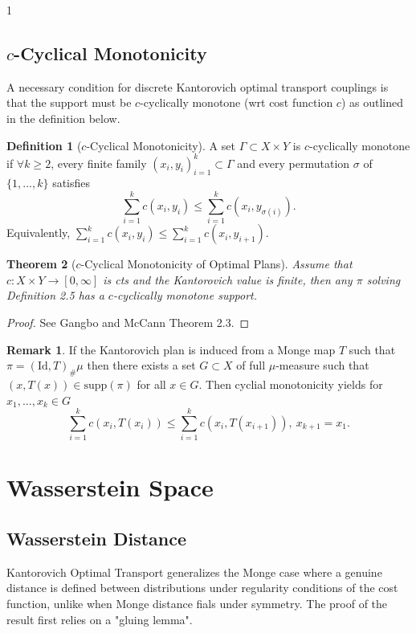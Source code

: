 \documentclass[12pt]{article}
\newtheorem{theorem}{Theorem}[section]
\theoremstyle{definition}
\newtheorem{definition}[theorem]{Definition}
\newtheorem*{remark}{Remark}
\theoremstyle{plain}
\begin{document}
\begin{spacing}{1}
{\newpage
\subsection{$c$-Cyclical Monotonicity}

A necessary condition for discrete Kantorovich optimal transport couplings is that the support must be $c$-cyclically monotone (wrt cost function $c$) as outlined in the definition below.

\begin{definition}[$c$-Cyclical Monotonicity]
    A set $\Gamma \subset X \times Y$ is $c$-cyclically monotone if $\forall k \geq 2$, every finite family $(x_i, y_i)_{i = 1}^k \subset \Gamma$ and every permutation $\sigma$ of $\{1, ..., k\}$ satisfies 
    \[
    \sum_{i = 1}^k c(x_i, y_i) \leq \sum_{i = 1}^k c(x_i, y_{\sigma(i)}).
    \]
    Equivalently, $\sum_{i = 1}^k c(x_i, y_i) \leq \sum_{i = 1}^k c(x_i, y_{i + 1})$.
\end{definition}

\begin{theorem}[$c$-Cyclical Monotonicity of Optimal Plans]
    Assume that $c: X \times Y \rightarrow [0, \infty]$ is cts and the Kantorovich value is finite, then any $\pi$ solving Definition 2.5 has a $c$-cyclically monotone support.
\end{theorem}

\begin{proof}
    See Gangbo and McCann \cite{gangbo} Theorem 2.3. 
\end{proof}

\begin{remark}
    If the Kantorovich plan is induced from a Monge map $T$ such that $\pi = (\text{Id}, T)_\# \mu$ then there exists a set $G \subset X$ of full $\mu$-measure such that $(x, T(x)) \in \text{supp}(\pi)$ for all $x \in G$. Then cyclial monotonicity yields for $x_1, ..., x_k \in G$
    \[
    \sum_{i = 1}^k c(x_i, T(x_i)) \leq \sum_{i = 1}^k c(x_i, T(x_{i + 1})), \ x_{k + 1} = x_1.
    \]
\end{remark}

\newpage
\section{Wasserstein Space}

\subsection{Wasserstein Distance}
Kantorovich Optimal Transport generalizes the Monge case where a genuine distance is defined between distributions under regularity conditions of the cost function, unlike when Monge distance fials under symmetry. The proof of the result first relies on a "gluing lemma".

}
\end{spacing}
\end{document}
